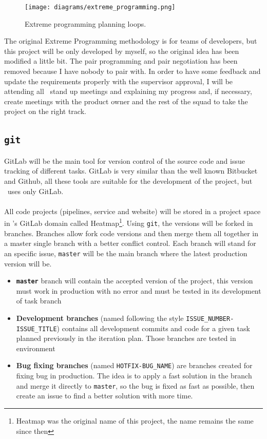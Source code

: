 \begin{figure}[H]
\centering
\texttt{[image: diagrams/extreme\_programming.png]}
\caption{Extreme programming planning loops.}
\end{figure}

The original Extreme Programming methodology is for teams of developers, but this project will be only developed by myself, so the original idea has been modified a little bit. The pair programming and pair negotiation has been removed because I have nobody to pair with. In order to have some feedback and update the requirements properly with the supervisor approval, I will be attending all \squad\ stand up meetings and explaining my progress and, if necessary, create meetings with the product owner and the rest of the squad to take the project on the right track.


\subsection{\texttt{git}}

GitLab will be the main tool for version control of the source code and issue tracking of different tasks. GitLab\cite{gitlab} is very similar than the well known Bitbucket\cite{bitbucket} and Github\cite{github}, all these tools are suitable for the development of the project, but \company\ uses only GitLab.
\\\\
All code projects (pipelines, service and website) will be stored in a project space in \company's GitLab domain called Heatmap\footnote{Heatmap was the original name of this project, the name remains the same since then}. Using \texttt{git}, the versions will be forked in branches. Branches allow fork code versions and then merge them all together in a master single branch with a better conflict control. Each branch will stand for an specific issue, \texttt{master} will be the main branch where the latest production version will be.

\begin{itemize}
    \item \textbf{\texttt{master}} branch will contain the accepted version of the project, this version must work in production with no error and must be tested in its development of task branch
    \item \textbf{Development branches} (named following the style \texttt{ISSUE\_NUMBER-ISSUE\_TITLE}) contains all development commits and code for a given task planned previously in the iteration plan. Those branches are tested in  environment 
    \item \textbf{Bug fixing branches} (named \texttt{HOTFIX-BUG\_NAME}) are branches created for fixing bug in production. The idea is to apply a fast solution in the branch and merge it directly to \texttt{master}, so the bug is fixed as fast as possible, then create an issue to find a better solution with more time.
\end{itemize}

